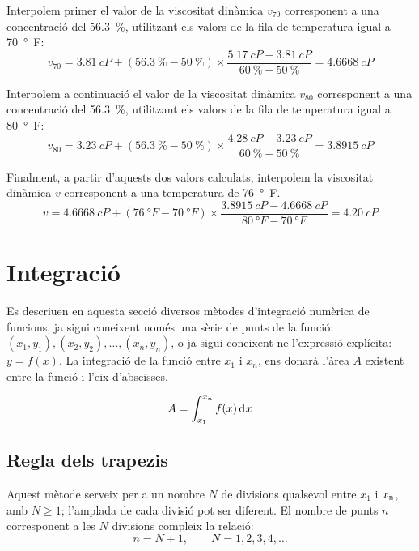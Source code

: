 \begin{exemple}
    Interpolem primer el valor de la viscositat dinàmica $v_{70}$ corresponent a una concentració del \qty{56,3}{\percent}, utilitzant els valors de la fila de temperatura igual a  \qty{70}{\degree F}:
    \[
         v_{70}=\qty{3,81}{cP}+(\qty{56,3}{\percent}-\qty{50}{\percent})\times
         \frac{\qty{5,17}{cP}-\qty{3,81}{cP}}{\qty{60}{\percent}-\qty{50}{\percent}}=\qty{4,6668}{cP}
    \]

    Interpolem a continuació el valor de la viscositat dinàmica $v_{80}$ corresponent a una concentració del \qty{56,3}{\percent}, utilitzant els valors de la fila de temperatura igual a  \qty{80}{\degree F}:
    \[
         v_{80} =\qty{3,23}{cP}+(\qty{56,3}{\percent}-\qty{50}{\percent})\times
         \frac{\qty{4,28}{cP}-\qty{3,23}{cP}}{\qty{60}{\percent}-\qty{50}{\percent}}=\qty{3,8915}{cP}
    \]

    Finalment, a partir d'aquests dos valors calculats, interpolem la viscositat dinàmica $v$ corresponent  a una temperatura de
    \qty{76}{\degree F}.
    \[
         v =\qty{4,6668}{cP}+(\qty{76}{\degree F}-\qty{70}{\degree F})\times
         \frac{\qty{3,8915}{cP}-\qty{4,6668}{cP}}{\qty{80}{\degree F}-\qty{70}{\degree F}}=\qty{4,20}{cP}
    \]

\end{exemple}

\section{Integració}\label{sec:int-mum}

Es descriuen en aquesta secció diversos mètodes d'integració numèrica de funcions, ja sigui coneixent només una sèrie de punts de la funció: $(x_1, y_1), (x_2, y_2), \dots ,(x_n, y_n)$, o ja sigui coneixent-ne l'expressió explícita: $y=f(x)$. La integració de la funció entre $x_1$ i $x_n$, ens donarà l'àrea $A$ existent entre la funció i l'eix d'abscisses.

 \begin{equation}
    A = \int_{x_1}^{x_n} f(x) \diff x
 \end{equation}

\subsection{Regla dels trapezis}
\label{sec:trapezis}

Aquest mètode serveix per a un nombre  $N$ de divisions qualsevol  entre $x_1$ i $x_\mathrm{n}$, amb $N \geq 1$; l'amplada de cada divisió pot ser diferent.  El nombre de punts $n$ corresponent a les $N$ divisions compleix la relació: 
\begin{equation}
n = N+1, \qquad N = 1, 2, 3, 4, \dots
\end{equation}

